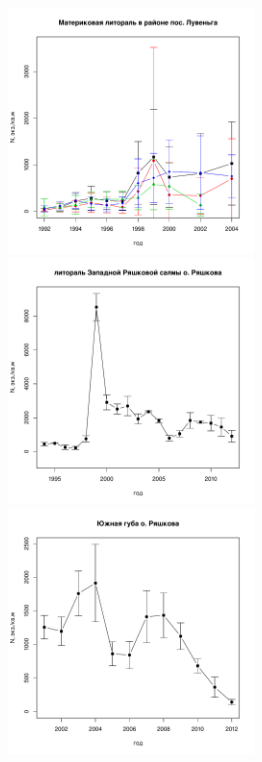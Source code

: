 \documentclass[12pt, a4paper]{disser}
\begin{document}
\begin{figure}[h]
\begin{minipage}[b]{.46\linewidth}
\begin{center}
		\includegraphics[width=65mm]{../White_Sea//Luvenga_II_razrez/N2_dynamic.pdf}
	\end{center}
	\end{minipage}
%
	\hfil %
%
	\begin{minipage}[b]{.46\linewidth}
	\begin{center}
		\includegraphics[width=65mm]{../White_Sea/Ryashkov_ZRS/N2_dynamic.pdf}
	\end{center}
	\end{minipage}
	\begin{minipage}[b]{.46\linewidth}
	\begin{center}
		\includegraphics[width=65mm]{../White_Sea/Ryashkov_YuG/N2_dynamic.pdf}

\end{center}
\end{minipage}
\end{figure}
\end{document}
